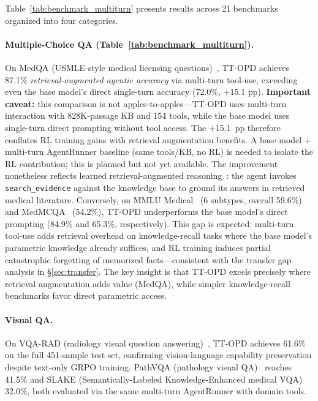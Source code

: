 \documentclass{article}
\begin{document}
Table~\ref{tab:benchmark_multiturn} presents results across 21 benchmarks organized into four categories.

\paragraph{Multiple-Choice QA (Table~\ref{tab:benchmark_multiturn}).} On MedQA (USMLE-style medical licensing questions)~\citep{jin2021medqa}, TT-OPD achieves 87.1\% \emph{retrieval-augmented agentic accuracy} via multi-turn tool-use, exceeding even the base model's direct single-turn accuracy (72.0\%, +15.1 pp). \textbf{Important caveat:} this comparison is not apples-to-apples---TT-OPD uses multi-turn interaction with 828K-passage KB and 154 tools, while the base model uses single-turn direct prompting without tool access. The +15.1~pp therefore conflates RL training gains with retrieval augmentation benefits. A base model + multi-turn AgentRunner baseline (same tools/KB, no RL) is needed to isolate the RL contribution; this is planned but not yet available. The improvement nonetheless reflects learned retrieval-augmented reasoning~\citep{lewis2020rag}: the agent invokes \texttt{search\_evidence} against the knowledge base to ground its answers in retrieved medical literature. Conversely, on MMLU Medical~\citep{hendrycks2021mmlu} (6 subtypes, overall 59.6\%) and MedMCQA~\citep{pal2022medmcqa} (54.2\%), TT-OPD underperforms the base model's direct prompting (84.9\% and 65.3\%, respectively). This gap is expected: multi-turn tool-use adds retrieval overhead on knowledge-recall tasks where the base model's parametric knowledge already suffices, and RL training induces partial catastrophic forgetting of memorized facts---consistent with the transfer gap analysis in \S\ref{sec:transfer}. The key insight is that TT-OPD excels precisely where retrieval augmentation adds value (MedQA), while simpler knowledge-recall benchmarks favor direct parametric access.

\paragraph{Visual QA.} On VQA-RAD (radiology visual question answering)~\citep{lau2018vqarad}, TT-OPD achieves 61.6\% on the full 451-sample test set, confirming vision-language capability preservation despite text-only GRPO training. PathVQA (pathology visual QA)~\citep{he2020pathvqa} reaches 41.5\% and SLAKE (Semantically-Labeled Knowledge-Enhanced medical VQA)~\citep{liu2021slake} 32.0\%, both evaluated via the same multi-turn AgentRunner with domain tools.
\end{document}
